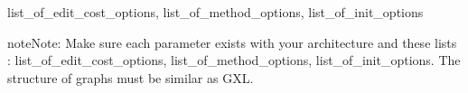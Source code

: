 \documentclass[letterpaper,10pt,english]{sphinxmanual}
\begin{document}
\begin{fulllineitems}
\begin{quote}
\begin{description}
\end{description}\end{quote}




list\_of\_edit\_cost\_options, list\_of\_method\_options, list\_of\_init\_options



\begin{notice}{note}{Note:}
Make sure each parameter exists with your architecture and these lists :  list\_of\_edit\_cost\_options, list\_of\_method\_options, list\_of\_init\_options. The structure of graphs must be similar as GXL.
\end{notice}

\end{fulllineitems}

\end{document}
